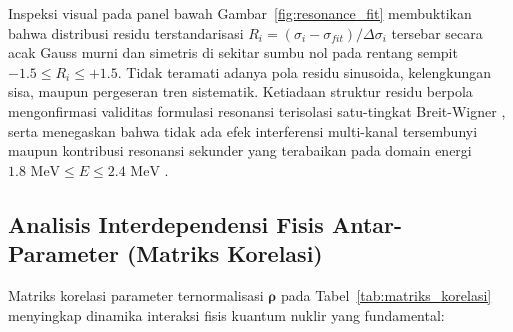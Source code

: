 Inspeksi visual pada panel bawah Gambar~\ref{fig:resonance_fit} membuktikan bahwa distribusi residu terstandarisasi $R_i = (\sigma_i - \sigma_{fit})/\Delta\sigma_i$ tersebar secara acak Gauss murni dan simetris di sekitar sumbu nol pada rentang sempit $-1.5 \le R_i \le +1.5$. Tidak teramati adanya pola residu sinusoida, kelengkungan sisa, maupun pergeseran tren sistematik. Ketiadaan struktur residu berpola mengonfirmasi validitas formulasi resonansi terisolasi satu-tingkat Breit-Wigner \parencite{breit1936capture}, serta menegaskan bahwa tidak ada efek interferensi multi-kanal tersembunyi maupun kontribusi resonansi sekunder yang terabaikan pada domain energi $1.8\text{ MeV} \le E \le 2.4\text{ MeV}$ \parencite{danon2018high,frohner2000evaluation}.

\subsection*{Analisis Interdependensi Fisis Antar-Parameter (Matriks Korelasi)}
Matriks korelasi parameter ternormalisasi $\boldsymbol{\rho}$ pada Tabel~\ref{tab:matriks_korelasi} menyingkap dinamika interaksi fisis kuantum nuklir yang fundamental:
